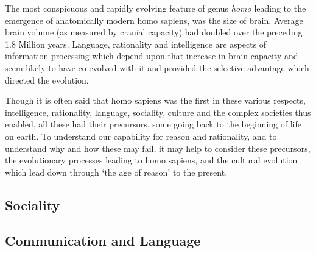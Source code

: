 \documentclass[10pt,titlepage]{article}
\begin{document}
The most conspicuous and rapidly evolving feature of genus \emph{homo} leading to the emergence of anatomically modern homo sapiens, was the size of brain.
Average brain volume (as measured by cranial capacity) had doubled over the preceding 1.8 Million years.
Language, rationality and intelligence are aspects of information processing which depend upon that increase in brain capacity and seem likely to have co-evolved with it and provided the selective advantage which directed the evolution.

Though it is often said that homo sapiens was the first in these various respects, intelligence, rationality, language, sociality, culture and the complex societies thus enabled, all these had their precursors, some going back to the beginning of life on earth.
To understand our capability for reason and rationality, and to understand why and how these may fail, it may help to consider these precursors, the evolutionary processes leading to homo sapiens, and the cultural evolution which lead down through `the age of reason' to the present.

\subsection{Sociality}

\subsection{Communication and Language}



\section{}

\cite{shapiro-tabp}

\cite{wilson-tvf}
\cite{berlinRR}
\cite{orwell-fd}




{}



\label{index}
{\twocolumn[]
{\small\printindex}}





\end{document}
